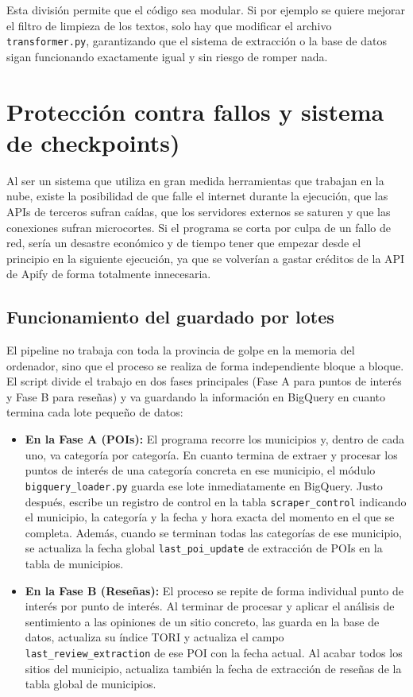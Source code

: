 Esta división permite que el código sea modular. Si por ejemplo se quiere mejorar el filtro de limpieza de los textos, solo hay que modificar el archivo \texttt{transformer.py}, garantizando que el sistema de extracción o la base de datos sigan funcionando exactamente igual y sin riesgo de romper nada.

\section{Protección contra fallos y sistema de checkpoints)}
Al ser un sistema que utiliza en gran medida herramientas que trabajan en la nube, existe la posibilidad de que falle el internet durante la ejecución, que las APIs de terceros sufran caídas, que los servidores externos se saturen y que las conexiones sufran microcortes. Si el programa se corta por culpa de un fallo de red, sería un desastre económico y de tiempo tener que empezar desde el principio en la siguiente ejecución, ya que se volverían a gastar créditos de la API de Apify de forma totalmente innecesaria.

\subsection{Funcionamiento del guardado por lotes}
El pipeline no trabaja con toda la provincia de golpe en la memoria del ordenador, sino que el proceso se realiza de forma independiente bloque a bloque. El script divide el trabajo en dos fases principales (Fase A para puntos de interés y Fase B para reseñas) y va guardando la información en BigQuery en cuanto termina cada lote pequeño de datos:
\begin{itemize}
    \item \textbf{En la Fase A (POIs):} El programa recorre los municipios y, dentro de cada uno, va categoría por categoría. En cuanto termina de extraer y procesar los puntos de interés de una categoría concreta en ese municipio, el módulo \texttt{bigquery\_loader.py} guarda ese lote inmediatamente en BigQuery. Justo después, escribe un registro de control en la tabla \texttt{scraper\_control} indicando el municipio, la categoría y la fecha y hora exacta del momento en el que se completa. Además, cuando se terminan todas las categorías de ese municipio, se actualiza la fecha global \texttt{last\_poi\_update} de extracción de POIs en la tabla de municipios.
    
    \item \textbf{En la Fase B (Reseñas):} El proceso se repite de forma individual punto de interés por punto de interés. Al terminar de procesar y aplicar el análisis de sentimiento a las opiniones de un sitio concreto, las guarda en la base de datos, actualiza su índice TORI y actualiza el campo \texttt{last\_review\_extraction} de ese POI con la fecha actual. Al acabar todos los sitios del municipio, actualiza también la fecha de extracción de reseñas de la tabla global de municipios.
\end{itemize}

